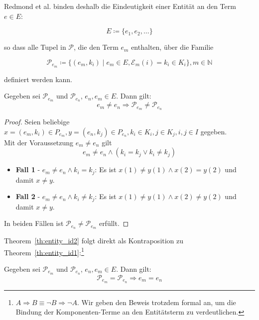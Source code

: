 \noindent
Redmond et al. binden deshalb die Eindeutigkeit einer Entität an den Term $e \in E$:

\[
    E \coloneqq \{e_1, e_2, \ldots\}
\]

\noindent
so dass alle Tupel in $\mathcal{P}$, die den Term $e_m$ enthalten, über die Familie

\[
    \mathcal{P}_{e_m} \coloneqq \{(e_m, k_i) \mid e_m \in E, \mathcal{E}_m(i) = k_i \in K_i\}, m \in \mathbb{N}
\]

\noindent
definiert werden kann.

\bigskip
\begin{theorem}\label{th:entity_id1}
    Gegeben sei $\mathcal{P}_{e_m}$ und $\mathcal{P}_{e_n}$, $e_n, e_m \in E$.
    Dann gilt:
    \[
         e_m \neq e_n \Rightarrow \mathcal{P}_{e_m} \neq \mathcal{P}_{e_n}
    \]
\end{theorem}
\bigskip

\begin{proof}
    Seien beliebige $x = (e_m, k_{i}) \in P_{e_m}, y = (e_n, k_j) \in P_{e_n}, k_i \in K_i, j \in K_j, i, j \in I$ gegeben.\\

    \noindent
    Mit der Voraussetzung $e_m \neq e_n$ gilt
    \[
        e_m \neq e_n \land (k_i = k_j \lor k_i \neq k_j)
    \]

    \begin{itemize}
        \item \textbf{Fall 1} - $e_m \neq e_n \land k_i = k_j$: Es ist $x(1) \neq y(1) \land x(2) = y(2)$ und damit $x \neq y$.
        \item \textbf{Fall 2} - $e_m \neq e_n \land k_i \neq k_j$: Es ist $x(1) \neq y(1) \land x(2) \neq y(2)$ und damit $x \neq y$.
    \end{itemize}

    \noindent
    In beiden Fällen ist  $\mathcal{P}_{e_n} \neq \mathcal{P}_{e_m}$ erfüllt.
\end{proof}
\bigskip

\noindent
Theorem~\ref{th:entity_id2} folgt direkt als Kontraposition zu Theorem~\ref{th:entity_id1}:\footnote{
    $A \Rightarrow B \equiv \neg B \Rightarrow \neg A$.
    Wir geben den Beweis trotzdem formal an, um die Bindung der Komponenten-Terme an den Entitätsterm zu verdeutlichen.
}

\begin{theorem}\label{th:entity_id2}
    Gegeben sei $\mathcal{P}_{e_m}$ und $\mathcal{P}_{e_n}$, $e_n, e_m \in E$.
    Dann gilt:
    \[
        \mathcal{P}_{e_m} = \mathcal{P}_{e_n} \Rightarrow e_m = e_n
    \]
\end{theorem}
\bigskip

